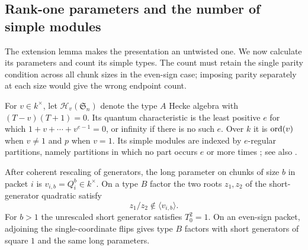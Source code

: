 \subsection{Rank-one parameters and the number of simple modules}

The extension lemma makes the presentation an untwisted one.
We now calculate its parameters and count its simple types.
The count must retain the single parity condition across all
chunk sizes in the even-sign case; imposing parity separately
at each size would give the wrong endpoint count.

For $v\in k^\times$, let $\mathcal H_v(\mathfrak S_n)$ denote
the type $A$ Hecke algebra with $(T-v)(T+1)=0$.  Its quantum
characteristic is the least positive $e$ for which
$1+v+\cdots+v^{e-1}=0$, or infinity if there is no such $e$.
Over $k$ it is $\operatorname{ord}(v)$ when $v\ne1$ and $p$ when $v=1$.
Its simple modules are indexed by $e$-regular partitions, namely
partitions in which no part occurs $e$ or more times
\cite{DipperJames}; see also \cite[Section~5 and Theorem~5.1]{DuRui}.

\begin{lemma}\label{end:parameters}
After coherent rescaling of generators, the long parameter on
chunks of size $b$ in packet $i$ is $v_{i,b}=Q_i^b\in k^\times$.
On a type $B$ factor the two roots $z_1,z_2$ of the short-generator
quadratic satisfy
\begin{equation}\label{end:separation}
 z_1/z_2\notin \langle v_{i,b}\rangle.
\end{equation}
For $b>1$ the unrescaled short generator satisfies $T_0^2=1$.
On an even-sign packet, adjoining the single-coordinate flips
gives type $B$ factors with short generators of square $1$ and
the same long parameters.
\end{lemma}

